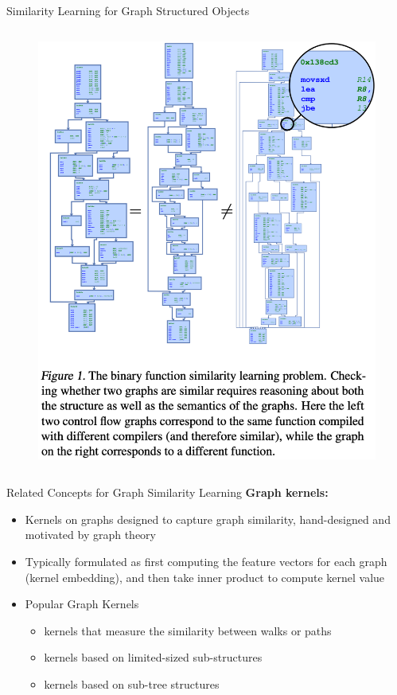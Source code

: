 \documentclass{beamer}
\begin{document}
\begin{frame}{Similarity Learning for Graph Structured Objects}
\begin{columns}
\begin{column}{0.5\linewidth}
    \begin{figure}
        \centering
        \includegraphics[height=0.8\textheight]{pic/GMN/gmn_fig1.png}
    \end{figure}
\end{column}
\end{columns}
\end{frame}


\begin{frame}{Related Concepts for Graph Similarity Learning}
\textbf{Graph kernels:}
\begin{itemize}
    \item Kernels on graphs designed to capture graph similarity, hand-designed and motivated by graph theory
    \item Typically formulated as first computing the feature vectors for each graph (kernel embedding), and then take inner product to compute kernel value
    \item Popular Graph Kernels
    \begin{itemize}
        \item kernels that measure the similarity between walks or paths
        \item kernels based on limited-sized sub-structures
        \item kernels based on sub-tree structures
    \end{itemize}
\end{itemize}
\end{frame}
\end{document}
